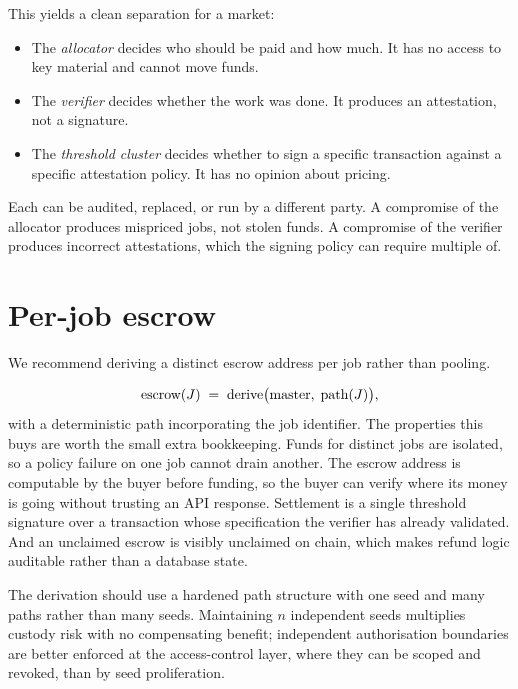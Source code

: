 \documentclass[11pt,a4paper]{article}
\begin{document}
This yields a clean separation for a market:

\begin{itemize}[leftmargin=1.4em]
\item The \emph{allocator} decides who should be paid and how much. It has no
      access to key material and cannot move funds.
\item The \emph{verifier} decides whether the work was done. It produces an
      attestation, not a signature.
\item The \emph{threshold cluster} decides whether to sign a specific
      transaction against a specific attestation policy. It has no opinion about
      pricing.
\end{itemize}

Each can be audited, replaced, or run by a different party. A compromise of the
allocator produces mispriced jobs, not stolen funds. A compromise of the verifier
produces incorrect attestations, which the signing policy can require multiple of.

\section{Per-job escrow}

We recommend deriving a distinct escrow address per job rather than pooling.

\begin{equation}
\text{escrow}(J) \;=\; \mathrm{derive}\big(\text{master},\; \text{path}(J)\big),
\end{equation}
with a deterministic path incorporating the job identifier. The properties this
buys are worth the small extra bookkeeping. Funds for distinct jobs are isolated,
so a policy failure on one job cannot drain another. The escrow address is
computable by the buyer before funding, so the buyer can verify where its money is
going without trusting an API response. Settlement is a single threshold
signature over a transaction whose specification the verifier has already
validated. And an unclaimed escrow is visibly unclaimed on chain, which makes
refund logic auditable rather than a database state.

The derivation should use a hardened path structure with one seed and many paths
rather than many seeds. Maintaining $n$ independent seeds multiplies custody risk
with no compensating benefit; independent authorisation boundaries are better
enforced at the access-control layer, where they can be scoped and revoked, than
by seed proliferation.
\end{document}
